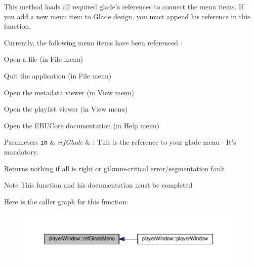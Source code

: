 This method loads all required glade's references to connect the menu items. If you add a new menu item to Glade design, you must append his reference in this function.\par
 \par
 Currently, the following menu items have been referenced \-:\par
 \begin{DoxyItemize}
\item { Open} a file (in File menu) \item { Quit} the application (in File menu) \item { Open} the metadata viewer (in View menu) \item { Open} the playlist viewer (in View menu) \item { Open} the E\-B\-U\-Core documentation (in Help menu)\par
 \par
 
\begin{DoxyParams}[1]{Parameters}
\mbox{\tt in}  & {\em ref\-Glade} & \-: This is the reference to your glade menu -\/ It's mandatory. \\
\hline
\end{DoxyParams}
\begin{DoxyReturn}{Returns}
nothing if all is right or gtkmm-\/critical error/segmentation fault 
\end{DoxyReturn}
\begin{DoxyNote}{Note}
This function and his documentation must be completed 
\end{DoxyNote}
\end{DoxyItemize}


Here is the caller graph for this function\-:\nopagebreak
\begin{figure}[H]
\begin{center}
\leavevmode
\includegraphics[width=350pt]{classplayerWindow_a486fe7a44df376b49f2d847773eca869_icgraph}
\end{center}
\end{figure}



